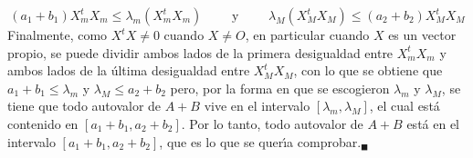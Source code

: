 \begin{solucion}
 \begin{equation*}
  (a_1 + b_1)X_m^tX_m \leq \lambda_m(X_m^t X_m)
  \qquad \text{ y } \qquad 
  \lambda_M(X_M^tX_M) \leq (a_2+b_2)X_M^tX_M
 \end{equation*}
 Finalmente, como $X^tX \neq 0$ cuando $X\neq O$, en particular cuando $X$ es un vector propio, se puede dividir ambos lados de la primera desigualdad entre $X_m^tX_m$ y ambos lados de la \'ultima desigualdad entre $X_M^tX_M$, con lo que se obtiene que $a_1 + b_1 \leq \lambda_m$ y $\lambda_M \leq a_2 + b_2$ pero, por la forma en que se escogieron $\lambda_m$ y $\lambda_M$, se tiene que todo autovalor de $A+B$ vive en el intervalo $[\lambda_m, \lambda_M]$, el cual est\'a contenido en $[a_1 + b_1, a_2 + b_2]$. Por lo tanto, todo autovalor de $A+B$ est\'a en el intervalo $[a_1 + b_1, a_2 + b_2]$, que es lo que se quer\'{\i}a comprobar.${}_{\blacksquare}$
\end{solucion}
